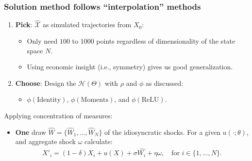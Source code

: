 \documentclass[aspectratio=169,10pt]{beamer}
\newcommand{\emphcolor}[1]{\textbf{\textcolor{emphcolorval}{#1}}}
\newcommand{\Xtrain}{\hat{\mathcal{X}}}
\begin{document}
\begin{frame}
	\frametitle{Solution method follows ``interpolation'' methods}
	\begin{enumerate}
		\item \emphcolor{Pick}: $\Xtrain$ as simulated trajectories from $X_0$:\vspace{0.1in}
			\begin{itemize}
				\item Only need $100$ to $1000$ points regardless of dimensionality of the state space $N$.\vspace{0.1in}
				\item Using economic insight (i.e., symmetry) gives us good generalization. \vspace{0.1in}
			\end{itemize}
		\item \emphcolor{Choose}:  Design the $\mathcal{H}(\Theta)$ with $\rho$ and $\phi$ as discussed:\vspace{0.1in}
			\begin{itemize}
				\item $\phi(\text{Identity})$, $\phi(\text{Moments})$, and  $\phi(\text{ReLU})$.\vspace{0.1in}
			\end{itemize}
   \end{enumerate}
	
	Applying concentration of measures:\vspace{0.1in}
	\begin{itemize}
		\item\emphcolor{One} draw $\hat{W}= \{\hat{W}_1,\ldots,\hat{W}_N\}$ of the idiosyncratic shocks. For a given $u(\cdot;\theta)$, and aggregate shock $\omega$ calculate:
		\begin{align*}
			X'_i = (1-\delta)X_i + u(X) + \sigma \hat{W_i} + \eta \omega,\quad\text{for } i \in \{1,...,N\}.
		\end{align*}
	\end{itemize}		 
	\end{frame}
\end{document}
